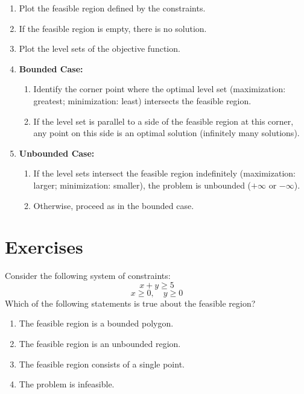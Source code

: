 \begin{algorithm}
\caption{Algorithm for Solving a Two-Variable Linear Programming Problem Graphically}
\label{alg:GraphLPGeneral}
\begin{enumerate}
    \item Plot the feasible region defined by the constraints.
    \item If the feasible region is empty, there is no solution.
    \item Plot the level sets of the objective function.
    \item \textbf{Bounded Case:}
    \begin{enumerate}
        \item Identify the corner point where the optimal level set (maximization: greatest; minimization: least) intersects the feasible region.
        \item If the level set is parallel to a side of the feasible region at this corner, any point on this side is an optimal solution (infinitely many solutions).
    \end{enumerate}
    \item \textbf{Unbounded Case:}
    \begin{enumerate}
        \item If the level sets intersect the feasible region indefinitely (maximization: larger; minimization: smaller), the problem is unbounded ($+\infty$ or $-\infty$).
        \item Otherwise, proceed as in the bounded case.
    \end{enumerate}
\end{enumerate}
\end{algorithm}


\newpage

\section{Exercises}\label{exercises}
\begin{ex}
Consider the following system of constraints:
\[
x + y \geq 5
\]
\[
x \geq 0, \quad y \geq 0
\]
Which of the following statements is true about the feasible region?
\begin{enumerate}
    \item  The feasible region is a bounded polygon.
    \item The feasible region is an unbounded region.
    \item The feasible region consists of a single point.
    \item The problem is infeasible.
\end{enumerate}


\end{ex}

